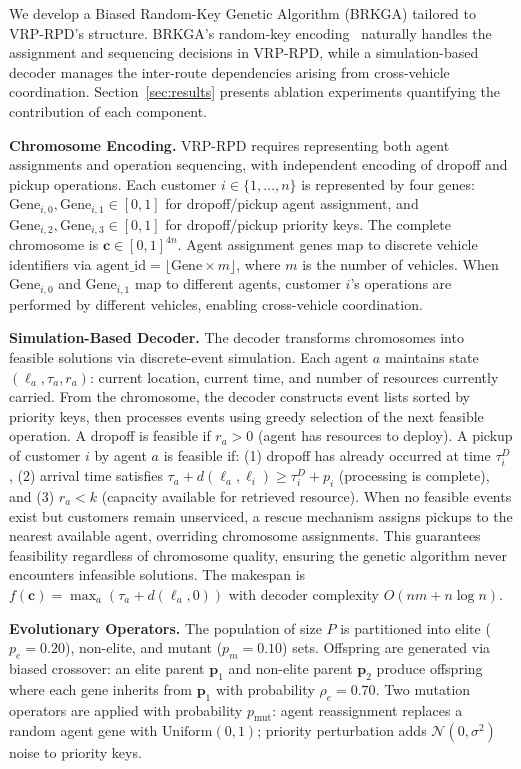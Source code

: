 \documentclass[sigconf]{acmart}
\begin{document}
We develop a Biased Random-Key Genetic Algorithm (BRKGA) tailored to VRP-RPD's structure. BRKGA's random-key encoding~\cite{goncalves2011, bean1994genetic} naturally handles the assignment and sequencing decisions in VRP-RPD, while a simulation-based decoder manages the inter-route dependencies arising from cross-vehicle coordination. Section~\ref{sec:results} presents ablation experiments quantifying the contribution of each component.

\textbf{Chromosome Encoding.} VRP-RPD requires representing both agent assignments and operation sequencing, with independent encoding of dropoff and pickup operations. Each customer $i \in \{1, \ldots, n\}$ is represented by four genes: $\text{Gene}_{i,0}, \text{Gene}_{i,1} \in [0,1]$ for dropoff/pickup agent assignment, and $\text{Gene}_{i,2}, \text{Gene}_{i,3} \in [0,1]$ for dropoff/pickup priority keys. The complete chromosome is $\mathbf{c} \in [0,1]^{4n}$. Agent assignment genes map to discrete vehicle identifiers via $\text{agent\_id} = \lfloor \text{Gene} \times m \rfloor$, where $m$ is the number of vehicles. When $\text{Gene}_{i,0}$ and $\text{Gene}_{i,1}$ map to different agents, customer $i$'s operations are performed by different vehicles, enabling cross-vehicle coordination.

\textbf{Simulation-Based Decoder.} The decoder transforms chromosomes into feasible solutions via discrete-event simulation. Each agent $a$ maintains state $(\ell_a, \tau_a, r_a)$: current location, current time, and number of resources currently carried. From the chromosome, the decoder constructs event lists sorted by priority keys, then processes events using greedy selection of the next feasible operation. A dropoff is feasible if $r_a > 0$ (agent has resources to deploy). A pickup of customer $i$ by agent $a$ is feasible if: (1) dropoff has already occurred at time $\tau_i^D$, (2) arrival time satisfies $\tau_a + d(\ell_a, \ell_i) \geq \tau_i^D + p_i$ (processing is complete), and (3) $r_a < k$ (capacity available for retrieved resource). When no feasible events exist but customers remain unserviced, a rescue mechanism assigns pickups to the nearest available agent, overriding chromosome assignments. This guarantees feasibility regardless of chromosome quality, ensuring the genetic algorithm never encounters infeasible solutions. The makespan is $f(\mathbf{c}) = \max_a (\tau_a + d(\ell_a, 0))$ with decoder complexity $O(nm + n \log n)$.

\textbf{Evolutionary Operators.} The population of size $P$ is partitioned into elite ($p_e = 0.20$), non-elite, and mutant ($p_m = 0.10$) sets. Offspring are generated via biased crossover: an elite parent $\mathbf{p}_1$ and non-elite parent $\mathbf{p}_2$ produce offspring where each gene inherits from $\mathbf{p}_1$ with probability $\rho_e = 0.70$. Two mutation operators are applied with probability $p_{\text{mut}}$: agent reassignment replaces a random agent gene with $\text{Uniform}(0,1)$; priority perturbation adds $\mathcal{N}(0, \sigma^2)$ noise to priority keys.
\end{document}

